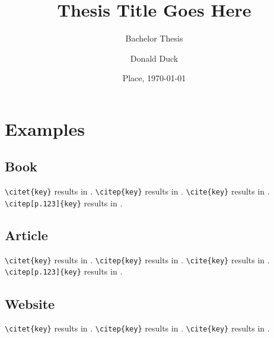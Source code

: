

\usepackage{sebithesistitle}

\title{Thesis Title Goes Here}
\subtitle{Bachelor Thesis}
\author{Donald Duck}
\def\place{Place}
\date{\place, \today}

\def\documentname{Project	Plan for Bachelor Thesis Project}
\def\studentname{Donald Duck}
\def\snumber{1234567}
\def\course{Informatics - Software Engineering}
\def\period{February 2017 - July 2017}
\def\companyname{company abc}
\def\companyaddress{Some Address}
\def\companypostcodecity{12345, Somewhere}
\def\companycountry{Germany}
\def\companycoach{John Doe}
\def\companycoachmail{john.doe@company.com}
\def\universitytutor{Lecturer A}
\def\universitytutormail{lecturer.a@fontys.nl}
\def\examinator{Professional A}
\def\externalexpert{Professional B}
\def\hasnda{no}




\maketitle


\newpage

\newpage
\chapter{Examples}
\section{Book}
\noindent
\verb=\citet{key}= results in \citet{goetz2006java}. \newline
\verb=\citep{key}= results in \citep{goetz2006java}. \newline
\verb=\cite{key}= results in \cite{goetz2006java}. \newline
\verb=\citep[p.123]{key}= results in \citep[p.123]{goetz2006java}.

\section{Article}
\noindent
\verb=\citet{key}= results in \citet{cattell2011scalable}. \newline
\verb=\citep{key}= results in \citep{cattell2011scalable}. \newline
\verb=\cite{key}= results in \cite{cattell2011scalable}. \newline
\verb=\citep[p.123]{key}= results in \citep[p.123]{cattell2011scalable}.

\section{Website}
\verb=\citet{key}= results in \citet{hom2017front}. \newline
\verb=\citep{key}= results in \citep{hom2017front}. \newline
\verb=\cite{key}= results in \cite{hom2017front}. \newline

\printbibliography

